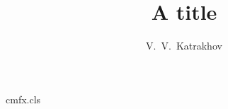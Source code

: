 \begin{filecontents*}[overwrite]{cmfx.cls}
\renewcommand{\author}[2][]{\gdef\firstshortauthor{#1}\gdef\authors{#2}}
\edef\author{\noexpand\@dblarg\expandafter\noexpand\csname\string\author\endcsname}
\let\firstshortauthor\@empty
\AtEndDocument{\par\firstshortauthor\par}
\end{filecontents*}
\documentclass{cmfx}
\title{A title}
\author[Valeriy V. Katrakhov (1949--2010)]{V.~V.~Katrakhov}

\maketitle
Text.

